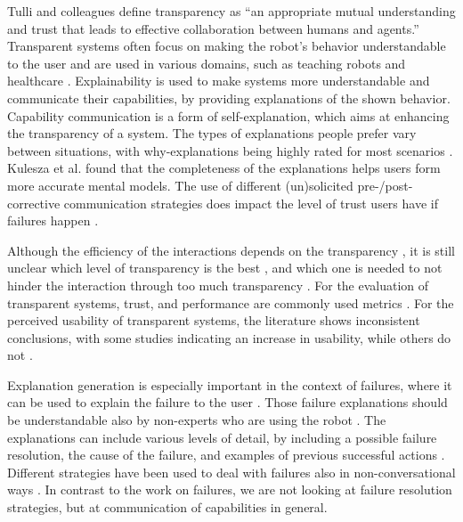 Tulli and colleagues \cite{Tulli_Correia_Mascarenhas_Gomes_Melo_Paiva_2019} define transparency as ``an appropriate mutual understanding and trust that leads to effective collaboration between humans and agents.'' 
Transparent systems often focus on making the robot's behavior understandable to the user \cite{Schött_Amin_Butz_2023} and are used in various domains, such as teaching robots \cite{Hirschmanner_Gross_Zafari_Krenn_Neubarth_Vincze_2021} and healthcare \cite{Nesset_Robb_Lopes_Hastie_2021}. Explainability is used to make systems more understandable and communicate their capabilities, by providing explanations of the shown behavior. Capability communication is a form of self-explanation, which aims at enhancing the transparency of a system.
The types of explanations people prefer vary between situations, with why-explanations being highly rated for most scenarios \cite{Wachowiak_Fenn_Kamran_Coles_Celiktutan_Canal_2024}.
Kulesza et al. \cite{Kulesza_Stumpf_Burnett_Yang_Kwan_Wong_2013} found that the completeness of the explanations helps users form more accurate mental models.
The use of different (un)solicited pre-/post-corrective communication strategies does impact the level of trust users have if failures happen \cite{ye2019human}.

Although the efficiency of the interactions depends on the transparency \cite{lyons2013being}, it is still unclear which level of transparency is the best \cite{Bhaskara_Skinner_Loft_2020}, and which one is needed to not hinder the interaction through too much transparency \cite{fischer2018transparent}.
For the evaluation of transparent systems, trust, and performance are commonly used metrics \cite{Schött_Amin_Butz_2023,hoffman2023measures}. For the perceived usability of transparent systems, the literature shows inconsistent conclusions, with some studies indicating an increase in usability, while others do not \cite{Bhaskara_Skinner_Loft_2020}.

Explanation generation is especially important in the context of failures, where it can be used to explain the failure to the user \cite{diehl2022did, das2021explainable, khanna2023user, lemasurier2024reactive}. Those failure explanations should be understandable also by non-experts who are using the robot \cite{das2021explainable}. The explanations can include various levels of detail, by including a possible failure resolution, the cause of the failure, and examples of previous successful actions \cite{khanna2023user}. Different strategies have been used to deal with failures also in non-conversational ways \cite{reig2021flailing}. In contrast to the work on failures, we are not looking at failure resolution strategies, but at communication of capabilities in general.